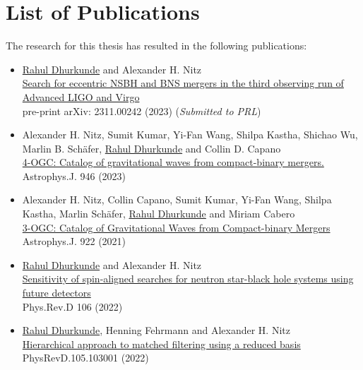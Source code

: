 \chapter{List of Publications}\label{app:publications}
The research for this thesis has resulted in the following publications:
\begin{itemize}
    \item[\cite{Dhurkunde:2023qoe}] \underline{Rahul Dhurkunde} and Alexander H. Nitz\\ \href{https://arxiv.org/abs/2311.00242}{Search for eccentric NSBH and BNS mergers in the third observing run of Advanced LIGO and Virgo}\\
    pre-print arXiv: 2311.00242 (2023) (\textit{Submitted to PRL})

    \item[\cite{Nitz:2021zwj}] Alexander H. Nitz, Sumit Kumar, Yi-Fan Wang, Shilpa Kastha, Shichao Wu, Marlin B. Schäfer, \underline{Rahul Dhurkunde} and Collin D. Capano\\
    \href{https://iopscience.iop.org/article/10.3847/1538-4357/aca591}{4-OGC: Catalog of gravitational waves from compact-binary mergers.}\\
    Astrophys.J. 946 (2023)

	\item[\cite{Nitz:2021uxj}]    Alexander H. Nitz, Collin Capano, Sumit Kumar, Yi-Fan Wang, Shilpa Kastha, Marlin Sch\"afer, \underline{Rahul Dhurkunde} and Miriam Cabero \\
    \href{https://iopscience.iop.org/article/10.3847/1538-4357/ac1c03}{3-OGC: Catalog of Gravitational Waves from Compact-binary Mergers}\\
    Astrophys.J. 922 (2021)
 
	\item[\cite{Dhurkunde:2022aek}] \underline{Rahul Dhurkunde} and Alexander H. Nitz\\ \href{https://journals.aps.org/prd/abstract/10.1103/PhysRevD.106.103035}{Sensitivity of spin-aligned searches for neutron star-black hole systems using future detectors}\\Phys.Rev.D 106 (2022) 

	\item[\cite{Dhurkunde:2021csz}] \underline{Rahul Dhurkunde}, Henning Fehrmann and Alexander H. Nitz\\
    \href{https://journals.aps.org/prd/abstract/10.1103/PhysRevD.105.103001}{Hierarchical approach to matched filtering using a reduced basis}\\
    PhysRevD.105.103001 (2022)
 
\end{itemize}